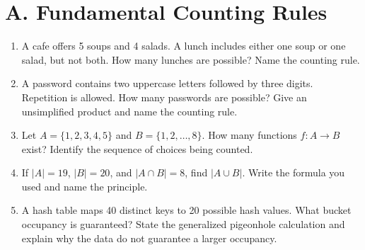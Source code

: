 \section*{A. Fundamental Counting Rules}

\begin{enumerate}[label=\textbf{A.\arabic*.}]
    \item A cafe offers 5 soups and 4 salads. A lunch includes either one soup
    or one salad, but not both. How many lunches are possible? Name the counting
    rule.

    \item A password contains two uppercase letters followed by three digits.
    Repetition is allowed. How many passwords are possible? Give an unsimplified
    product and name the counting rule.

    \item Let $A=\{1,2,3,4,5\}$ and $B=\{1,2,\ldots,8\}$. How many functions
    $f:A\to B$ exist? Identify the sequence of choices being counted.

    \item If $|A|=19$, $|B|=20$, and $|A\cap B|=8$, find $|A\cup B|$. Write
    the formula you used and name the principle.

    \item A hash table maps 40 distinct keys to 20 possible hash values. What
    bucket occupancy is guaranteed? State the generalized pigeonhole calculation
    and explain why the data do not guarantee a larger occupancy.
\end{enumerate}
